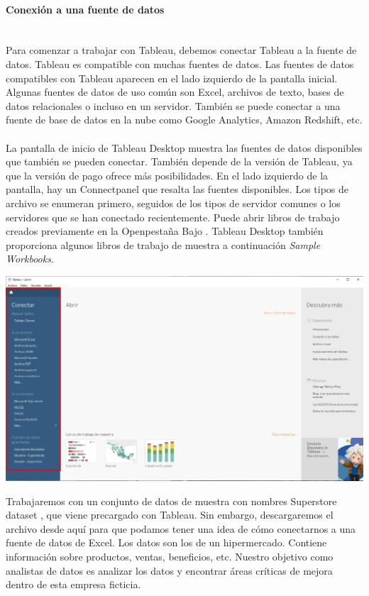 \documentclass[12pt,letterpaper]{article}
\begin{document}
    \paragraph{\Large Conexión a una fuente de datos\\ \\}
    Para comenzar a trabajar con Tableau, debemos conectar Tableau a la fuente de datos. Tableau es compatible con muchas fuentes de datos. Las fuentes de datos compatibles con Tableau aparecen en el lado izquierdo de la pantalla inicial. Algunas fuentes de datos de uso común son Excel, archivos de texto, bases de datos relacionales o incluso en un servidor. También se puede conectar a una fuente de base de datos en la nube como Google Analytics, Amazon Redshift, etc.\\ \\
    La pantalla de inicio de Tableau Desktop muestra las fuentes de datos disponibles que también se pueden conectar. También depende de la versión de Tableau, ya que la versión de pago ofrece más posibilidades. En el lado izquierdo de la pantalla, hay un Connectpanel que resalta las fuentes disponibles. Los tipos de archivo se enumeran primero, seguidos de los tipos de servidor comunes o los servidores que se han conectado recientemente. Puede abrir libros de trabajo creados previamente en la Openpestaña Bajo . Tableau Desktop también proporciona algunos libros de trabajo de muestra a continuación \textit{Sample Workbooks}.
    \begin{center}
        \includegraphics[width=16cm]{./img/img3.png}
    \end{center}
    Trabajaremos con un conjunto de datos de muestra con nombres Superstore dataset , que viene precargado con Tableau. Sin embargo, descargaremos el archivo desde aquí para que podamos tener una idea de cómo conectarnos a una fuente de datos de Excel. Los datos son los de un hipermercado. Contiene información sobre productos, ventas, beneficios, etc. Nuestro objetivo como analistas de datos es analizar los datos y encontrar áreas críticas de mejora dentro de esta empresa ficticia.
\end{document}
